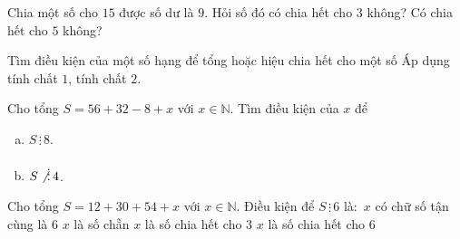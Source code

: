 \begin{vd}%
	Chia một số cho $15$ được số dư là $9$. Hỏi số đó có chia hết cho $3$ không? Có chia hết cho $5$ không?
\end{vd}
%
\begin{dang}{Tìm điều kiện của một số hạng để tổng hoặc hiệu chia hết cho một số}
	Áp dụng tính chất $1$, tính chất $2$.
\end{dang}

\begin{vd}%
	Cho tổng $S=56+32-8+x$ với $x \in \mathbb{N}$. Tìm điều kiện của $x$ để
	\begin{enumerate}[a)]
		\item $S \,\vdots\, 8$.
		\item $S \not \,\vdots\, 4$.
	\end{enumerate}
\end{vd}
\begin{vd}%
	Cho tổng $S=12+30+54+x$ với $x \in \mathbb{N}$. Điều kiện để $S \,\vdots\, 6$ là$\colon$
	\choice
	{$x$ có chữ số tận cùng là $6$}
	{$x$ là số chẵn}
	{$x$ là số chia hết cho $3$}
	{\True $x$ là số chia hết cho $6$ }
\end{vd}
